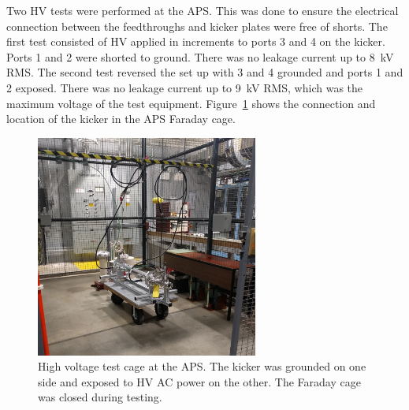 Two HV tests were performed at the APS. This was done to ensure the electrical connection 
between the feedthroughs and kicker plates were free of shorts. 
The first test consisted of HV applied in increments to ports 3 and 4 on the kicker.  
Ports 1 and 2 were shorted to ground. There was no leakage current up to \SI{8}{kV} RMS.
The second test reversed the set up with 3 and 4 grounded and ports 1 and 2 exposed. 
There was no leakage current up to \SI{9}{kV} RMS, which was the maximum voltage of the test equipment.
Figure~\ref{fig:AWAHVkicker} shows the connection and location of the kicker in the APS Faraday cage.
\begin{figure}%
	\begin{center}
		\includegraphics[width=0.65\textwidth]{./images/kicker1}
		\caption{High voltage test cage at the APS. 
			The kicker was grounded on one side and exposed to HV AC power on the other. 
			The Faraday cage was closed during testing. }
		\label{fig:AWAHVkicker}
	\end{center}
\end{figure}


